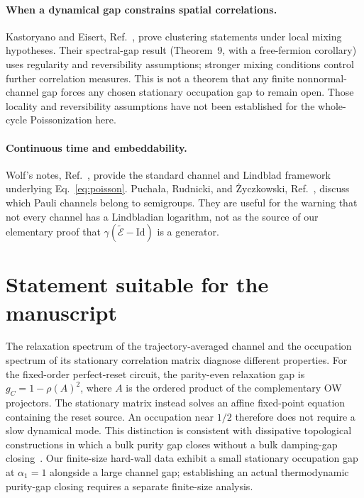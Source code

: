\documentclass[aps,prb,twocolumn,nofootinbib,superscriptaddress]{revtex4-2}
\newcommand{\E}{\widetilde{\mathcal E}}
\begin{document}
\paragraph{When a dynamical gap constrains spatial correlations.}
Kastoryano and Eisert, Ref.~\cite{KE}, prove clustering statements
under local mixing hypotheses. Their spectral-gap result
(Theorem~9, with a free-fermion corollary) uses regularity and
reversibility assumptions; stronger mixing conditions control further
correlation measures. This is not a theorem that any finite
nonnormal-channel gap forces any chosen stationary occupation gap
to remain open. Those locality and reversibility assumptions have
not been established for the whole-cycle Poissonization here.

\paragraph{Continuous time and embeddability.}
Wolf's notes, Ref.~\cite{Wolf}, provide the standard channel and
Lindblad framework underlying Eq.~\eqref{eq:poisson}. Pucha\l{}a,
Rudnicki, and \.{Z}yczkowski, Ref.~\cite{PRZ}, discuss which Pauli
channels belong to semigroups. They are useful for the warning that
not every channel has a Lindbladian logarithm, not as the source of
our elementary proof that $\gamma(\E-\mathrm{Id})$ is a generator.

\section{Statement suitable for the manuscript}
The relaxation spectrum of the trajectory-averaged channel and the
occupation spectrum of its stationary correlation matrix diagnose
different properties. For the fixed-order perfect-reset circuit, the
parity-even relaxation gap is $g_C=1-\rho(A)^2$, where $A$ is the
ordered product of the complementary OW projectors. The stationary
matrix instead solves an affine fixed-point equation containing the
reset source. An occupation near $1/2$ therefore does not require a
slow dynamical mode. This distinction is consistent with dissipative
topological constructions in which a bulk purity gap closes without
a bulk damping-gap closing~\cite{Bardyn}. Our finite-size hard-wall
data exhibit a small stationary occupation gap at $\alpha_1=1$
alongside a large channel gap; establishing an actual thermodynamic
purity-gap closing requires a separate finite-size analysis.
\end{document}
